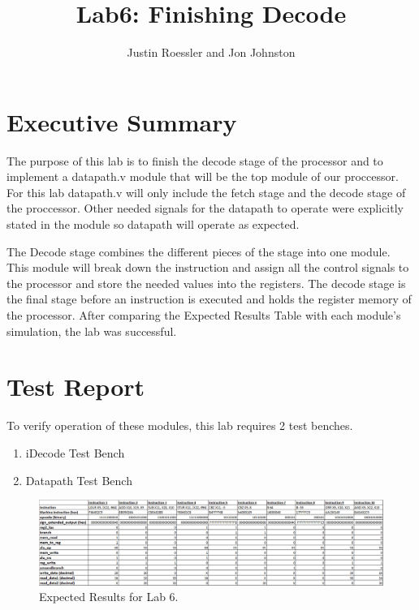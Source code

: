 \documentclass{article}
\author{Justin Roessler and Jon Johnston}
\title{Lab6: Finishing Decode}
\begin{document}
\maketitle

\section{Executive Summary}
The purpose of this lab is to finish the decode stage of the processor and to implement a datapath.v module that will be the top module of our proccessor. For this lab datapath.v will only include the fetch stage and the decode stage of the proccessor. Other needed signals for the datapath to operate were explicitly stated in the module so datapath will operate as expected. 

The Decode stage combines the different pieces of the stage into one module. This module will break down the instruction and assign all the control signals to the processor and store the needed values into the registers. The decode stage is the final stage before an instruction is executed and holds the register memory of the processor. After comparing the Expected Results Table with each module's simulation, the lab was successful.	

\section{Test Report}
To verify operation of these modules, this lab requires 2 test benches.  
\begin{enumerate}
	\item iDecode Test Bench
	\item Datapath Test Bench
\end{enumerate}


\pagebreak

\begin{figure}[H]
	\begin{center}
		\caption{Expected Results for Lab 6.}\label{fig:Lab6Expected}
		\includegraphics[width=1.0\textwidth]{../images/Lab6Expected.png}
	\end{center}
\end{figure}
\end{document}
